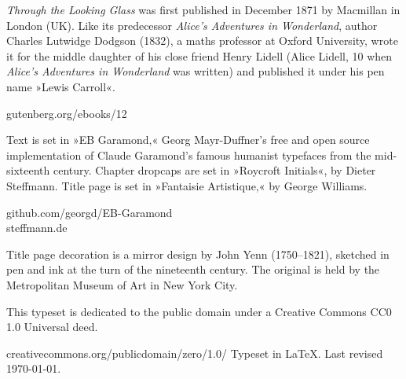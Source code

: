 \documentclass[
a5paper,
]{scrbook}
\begin{document}
\vfill
\begin{minipage}{\textwidth}
\textit{Through the Looking Glass} was first published in December 1871 by Macmillan in London (UK). Like its predecessor \textit{Alice's Adventures in Wonderland}, author Charles Lutwidge Dodgson (1832), a maths professor at Oxford University, wrote it for the middle daughter of his close friend Henry Lidell (Alice Lidell, 10 when \textit{Alice's Adventures in Wonderland} was written) and published it under his pen name »Lewis Carroll«.
\end{minipage}
\vfill
gutenberg.org/ebooks/12
\vfill
\divider
\vfill
\begin{minipage}{\textwidth}
Text is set in »EB Garamond,« Georg Mayr-Duffner's free and open source implementation of Claude Garamond’s famous humanist typefaces from the mid-sixteenth century. Chapter dropcaps are set in »Roycroft Initials«, by Dieter Steffmann. Title page is set in »Fantaisie Artistique,« by George Williams. 
\end{minipage}
\vfill
github.com/georgd/EB-Garamond\\steffmann.de
\vfill
\divider
\vfill
\begin{minipage}{\textwidth}
Title page decoration is a mirror design by John Yenn (1750--1821), sketched in pen and ink at the turn of the nineteenth century. The original is held by the Metropolitan Museum of Art in New York City.
\end{minipage}
\vfill
\divider
\vfill
\begin{minipage}{\textwidth}
This typeset is dedicated to the public domain under a Creative Commons CC0 1.0 Universal deed. 
\end{minipage}
\vfill
creativecommons.org/publicdomain/zero/1.0/
\vfill
\divider
\vfill
Typeset in \LaTeX{}. Last revised \today.
\thispagestyle{empty}
\end{document}
